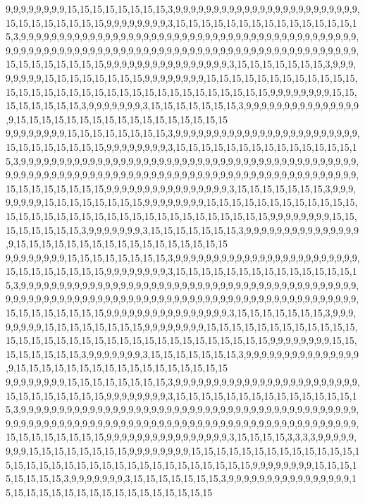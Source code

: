 9,9,9,9,9,9,9,9,15,15,15,15,15,15,15,15,3,9,9,9,9,9,9,9,9,9,9,9,9,9,9,9,9,9,9,9,9,9,9,9,9,15,15,15,15,15,15,15,15,9,9,9,9,9,9,9,9,3,15,15,15,15,15,15,15,15,15,15,15,15,15,15,15,3,9,9,9,9,9,9,9,9,9,9,9,9,9,9,9,9,9,9,9,9,9,9,9,9,9,9,9,9,9,9,9,9,9,9,9,9,9,9,9,9,9,9,9,9,9,9,9,9,9,9,9,9,9,9,9,9,9,9,9,9,9,9,9,9,9,9,9,9,9,9,9,9,9,9,9,9,9,9,9,9,9,9,9,9,9,9,9,9,9,9,15,15,15,15,15,15,15,15,9,9,9,9,9,9,9,9,9,9,9,9,9,9,9,9,3,15,15,15,15,15,15,15,3,9,9,9,9,9,9,9,9,15,15,15,15,15,15,15,15,9,9,9,9,9,9,9,9,15,15,15,15,15,15,15,15,15,15,15,15,15,15,15,15,15,15,15,15,15,15,15,15,15,15,15,15,15,15,15,15,15,9,9,9,9,9,9,9,9,15,15,15,15,15,15,15,15,3,9,9,9,9,9,9,9,3,15,15,15,15,15,15,15,3,9,9,9,9,9,9,9,9,9,9,9,9,9,9,9,9,15,15,15,15,15,15,15,15,15,15,15,15,15,15,15,15,15
9,9,9,9,9,9,9,9,15,15,15,15,15,15,15,15,3,9,9,9,9,9,9,9,9,9,9,9,9,9,9,9,9,9,9,9,9,9,9,9,9,15,15,15,15,15,15,15,15,9,9,9,9,9,9,9,9,3,15,15,15,15,15,15,15,15,15,15,15,15,15,15,15,3,9,9,9,9,9,9,9,9,9,9,9,9,9,9,9,9,9,9,9,9,9,9,9,9,9,9,9,9,9,9,9,9,9,9,9,9,9,9,9,9,9,9,9,9,9,9,9,9,9,9,9,9,9,9,9,9,9,9,9,9,9,9,9,9,9,9,9,9,9,9,9,9,9,9,9,9,9,9,9,9,9,9,9,9,9,9,9,9,9,9,15,15,15,15,15,15,15,15,9,9,9,9,9,9,9,9,9,9,9,9,9,9,9,9,3,15,15,15,15,15,15,15,3,9,9,9,9,9,9,9,9,15,15,15,15,15,15,15,15,9,9,9,9,9,9,9,9,15,15,15,15,15,15,15,15,15,15,15,15,15,15,15,15,15,15,15,15,15,15,15,15,15,15,15,15,15,15,15,15,15,9,9,9,9,9,9,9,9,15,15,15,15,15,15,15,15,3,9,9,9,9,9,9,9,3,15,15,15,15,15,15,15,3,9,9,9,9,9,9,9,9,9,9,9,9,9,9,9,9,15,15,15,15,15,15,15,15,15,15,15,15,15,15,15,15,15
9,9,9,9,9,9,9,9,15,15,15,15,15,15,15,15,3,9,9,9,9,9,9,9,9,9,9,9,9,9,9,9,9,9,9,9,9,9,9,9,9,15,15,15,15,15,15,15,15,9,9,9,9,9,9,9,9,3,15,15,15,15,15,15,15,15,15,15,15,15,15,15,15,3,9,9,9,9,9,9,9,9,9,9,9,9,9,9,9,9,9,9,9,9,9,9,9,9,9,9,9,9,9,9,9,9,9,9,9,9,9,9,9,9,9,9,9,9,9,9,9,9,9,9,9,9,9,9,9,9,9,9,9,9,9,9,9,9,9,9,9,9,9,9,9,9,9,9,9,9,9,9,9,9,9,9,9,9,9,9,9,9,9,9,15,15,15,15,15,15,15,15,9,9,9,9,9,9,9,9,9,9,9,9,9,9,9,9,3,15,15,15,15,15,15,15,3,9,9,9,9,9,9,9,9,15,15,15,15,15,15,15,15,9,9,9,9,9,9,9,9,15,15,15,15,15,15,15,15,15,15,15,15,15,15,15,15,15,15,15,15,15,15,15,15,15,15,15,15,15,15,15,15,15,9,9,9,9,9,9,9,9,15,15,15,15,15,15,15,15,3,9,9,9,9,9,9,9,3,15,15,15,15,15,15,15,3,9,9,9,9,9,9,9,9,9,9,9,9,9,9,9,9,15,15,15,15,15,15,15,15,15,15,15,15,15,15,15,15,15
9,9,9,9,9,9,9,9,15,15,15,15,15,15,15,15,3,9,9,9,9,9,9,9,9,9,9,9,9,9,9,9,9,9,9,9,9,9,9,9,9,15,15,15,15,15,15,15,15,9,9,9,9,9,9,9,9,3,15,15,15,15,15,15,15,15,15,15,15,15,15,15,15,3,9,9,9,9,9,9,9,9,9,9,9,9,9,9,9,9,9,9,9,9,9,9,9,9,9,9,9,9,9,9,9,9,9,9,9,9,9,9,9,9,9,9,9,9,9,9,9,9,9,9,9,9,9,9,9,9,9,9,9,9,9,9,9,9,9,9,9,9,9,9,9,9,9,9,9,9,9,9,9,9,9,9,9,9,9,9,9,9,9,9,15,15,15,15,15,15,15,15,9,9,9,9,9,9,9,9,9,9,9,9,9,9,9,9,3,15,15,15,15,3,3,3,3,9,9,9,9,9,9,9,9,15,15,15,15,15,15,15,15,9,9,9,9,9,9,9,9,15,15,15,15,15,15,15,15,15,15,15,15,15,15,15,15,15,15,15,15,15,15,15,15,15,15,15,15,15,15,15,15,15,9,9,9,9,9,9,9,9,15,15,15,15,15,15,15,15,3,9,9,9,9,9,9,9,3,15,15,15,15,15,15,15,3,9,9,9,9,9,9,9,9,9,9,9,9,9,9,9,9,15,15,15,15,15,15,15,15,15,15,15,15,15,15,15,15,15
